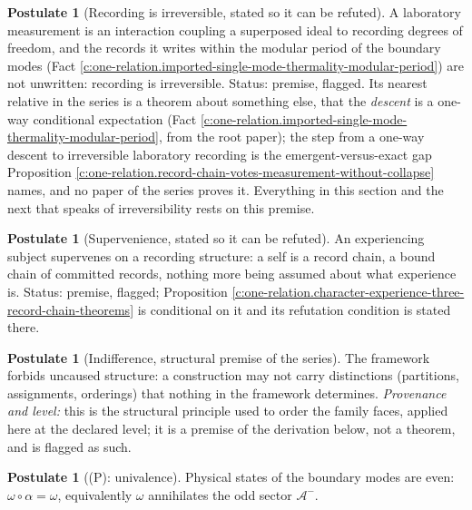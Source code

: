 \documentclass[11pt]{article}
\theoremstyle{definition}
\newtheorem{postulate}[theorem]{Postulate}
\theoremstyle{plain}
\providecommand{\Aod}{}\renewcommand{\Aod}{\mathcal{A}^{-}}
\begin{document}
\begin{postulate}[Recording is irreversible, stated so it can be refuted]\label{c:one-relation.recording-irreversible-stated-so-it-can}
A laboratory measurement is an interaction coupling a superposed ideal to recording degrees of freedom, and the records it writes within the modular period of the boundary modes (Fact \ref{c:one-relation.imported-single-mode-thermality-modular-period}) are not unwritten: recording is irreversible. Status: premise, flagged. Its nearest relative in the series is a theorem about something else, that the \emph{descent} is a one-way conditional expectation (Fact \ref{c:one-relation.imported-single-mode-thermality-modular-period}, from the root paper); the step from a one-way descent to irreversible laboratory recording is the emergent-versus-exact gap Proposition \ref{c:one-relation.record-chain-votes-measurement-without-collapse} names, and no paper of the series proves it. Everything in this section and the next that speaks of irreversibility rests on this premise.
\end{postulate}

\begin{postulate}[Supervenience, stated so it can be refuted]\label{c:one-relation.supervenience-stated-so-it-can-be}
An experiencing subject supervenes on a recording structure: a self is a record chain, a bound chain of committed records, nothing more being assumed about what experience is. Status: premise, flagged; Proposition \ref{c:one-relation.character-experience-three-record-chain-theorems} is conditional on it and its refutation condition is stated there.
\end{postulate}

\begin{postulate}[Indifference, structural premise of the series]\label{c:scrambling.indifference-structural-premise-series}
The framework forbids uncaused structure: a construction may not carry distinctions (partitions, assignments, orderings) that nothing in the framework determines. \emph{Provenance and level:} this is the structural principle used to order the family faces, applied here at the declared level; it is a premise of the derivation below, not a theorem, and is flagged as such.
\end{postulate}

\begin{postulate}[(P): univalence]\label{c:singularity.p-univalence}
Physical states of the boundary modes are even: $\omega \circ \alpha = \omega$, equivalently $\omega$ annihilates the odd sector $\Aod$.
\end{postulate}
\end{document}
